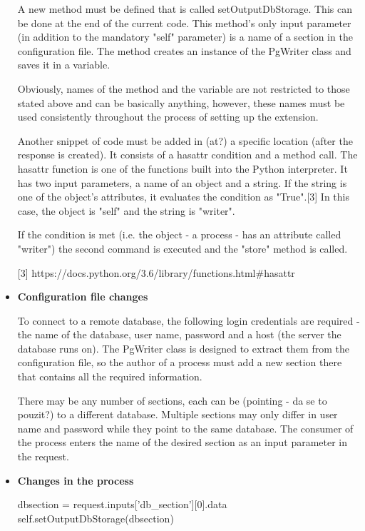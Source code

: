 \begin{itemize}
A new method must be defined that is called setOutputDbStorage. This can be done at the end of the current code. This method's only input parameter (in addition to the mandatory "self" parameter) is a name of a section in the configuration file. The method creates an instance of the PgWriter class and saves it in a variable.

Obviously, names of the method and the variable are not restricted to those stated above and can be basically anything, however, these names must be used consistently throughout the process of setting up the extension.

Another snippet of code must be added in (at?) a specific location (after the response is created). It consists of a hasattr condition and a method call. The hasattr function is one of the functions built into the Python interpreter. It has two input parameters, a name of an object and a string. If the string is one of the object's attributes, it evaluates the condition as "True".[3] In this case, the object is "self" and the string is "writer". 

If the condition is met (i.e. the object - a process - has an attribute called "writer") the second command is executed and the "store" method is called.

[3] https://docs.python.org/3.6/library/functions.html#hasattr


\item \textbf{Configuration file changes}

To connect to a remote database, the following login credentials are required - the name of the database, user name, password and a host (the server the database runs on). The PgWriter class is designed to extract them from the configuration file, so the author of a process must add a new section there that contains all the required information. 

There may be any number of sections, each can be (pointing - da se to pouzit?) to a different database. Multiple sections may only differ in user name and password while they point to the same database. The consumer of the process enters the name of the desired section as an input parameter in the request. 

\item \textbf{Changes in the process}

        dbsection = request.inputs['db_section'][0].data
        self.setOutputDbStorage(dbsection)
        
      
\end{itemize}

